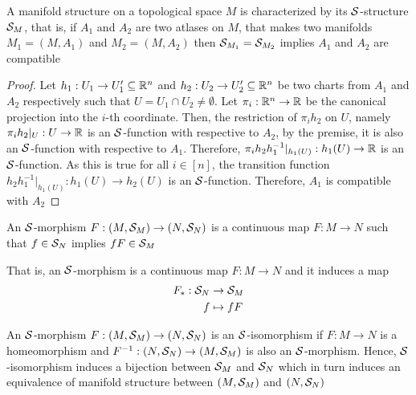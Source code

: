 \begin{proposition}
	A manifold structure on a topological space $M$ is characterized by its $\mathcal{S}$-structure $\mathcal{S}_M$, that is, if $A_1$ and $A_2$ are two atlases on $M$, that makes two manifolds $M_1 = (M, A_1)$ and $M_2 = (M, A_2)$ then $\mathcal{S}_{M_1} = \mathcal{S}_{M_2}$ implies $A_1$ and $A_2$ are compatible
	\begin{proof}
		Let $h_1: U_1 \to U_1' \subseteq \mathbb{R}^n$ and $h_2: U_2 \to U_2' \subseteq \mathbb{R}^n$ be two charts from $A_1$ and $A_2$ respectively such that $U = U_1 \cap U_2 \neq \emptyset$. Let $\pi_i: \mathbb{R}^n \to \mathbb{R}$ be the canonical projection into the $i$-th coordinate. Then, the restriction of $\pi_i h_2$ on $U$, namely $\pi_i h_2 \vert_U: U \to \mathbb{R}$ is an $\mathcal{S}$-function with respective to $A_2$, by the premise, it is also an $\mathcal{S}$-function with respective to $A_1$. Therefore, $\pi_i h_2 h_1^{-1} \vert_{h_1(U)}: h_1(U) \to \mathbb{R}$ is an $\mathcal{S}$-function. As this is true for all $i \in [n]$, the transition function $h_2 h_1^{-1} \vert_{h_1(U)}: h_1(U) \to h_2(U)$ is an $\mathcal{S}$-function. Therefore, $A_1$ is compatible with $A_2$
	\end{proof}
\end{proposition}

\begin{definition}
	An $\mathcal{S}$-morphism $F: (M, \mathcal{S}_M) \to (N, \mathcal{S}_N)$ is a continuous map $F: M \to N$ such that $f \in \mathcal{S}_N$ implies $f F \in \mathcal{S}_M$
	\begin{center}
	\end{center}
	That is, an $\mathcal{S}$-morphism is a continuous map $F: M \to N$ and it induces a map
	\begin{align*}
		F_*: \mathcal{S}_N &\to \mathcal{S}_M \\
		f &\mapsto fF
	\end{align*}
\end{definition}

\begin{definition}
	An $\mathcal{S}$-morphism $F: (M, \mathcal{S}_M) \to (N, \mathcal{S}_N)$ is an $\mathcal{S}$-isomorphism if $F: M \to N$ is a homeomorphism and $F^{-1}: (N, \mathcal{S}_N) \to (M, \mathcal{S}_M)$ is also an $\mathcal{S}$-morphism.
	Hence, $\mathcal{S}$-isomorphism induces a bijection between $\mathcal{S}_M$ and $\mathcal{S}_N$ which in turn induces an equivalence of manifold structure between $(M, \mathcal{S}_M)$ and $(N, \mathcal{S}_N)$
\end{definition}

